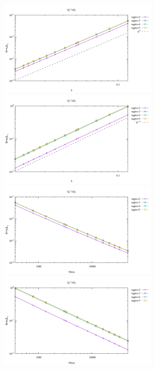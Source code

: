 \begin{center}
\includegraphics[width=8cm]{python_codes/fieldstone_120/results/Q1+Q1-velocity-h.pdf}
\includegraphics[width=8cm]{python_codes/fieldstone_120/results/Q1+Q1-pressure-h.pdf}
\includegraphics[width=8cm]{python_codes/fieldstone_120/results/Q1+Q1-velocity-Nfem.pdf}
\includegraphics[width=8cm]{python_codes/fieldstone_120/results/Q1+Q1-pressure-Nfem.pdf}
\end{center}

\newpage
